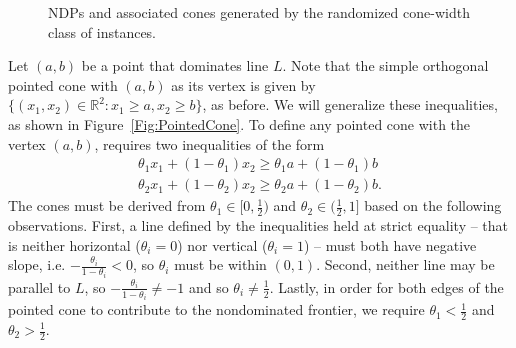\documentclass[11pt]{article} %
\def\real{\mathbb{R}}
\def\R{\real}
\begin{document}
\begin{figure}[t!]
\scriptsize
\begin{center}
\vspace{0.2cm}
\caption{NDPs and associated cones generated by the randomized cone-width class of instances. \label{Fig:RandDistInstances} }
\end{center}
\end{figure}

Let $(a,b)$ be a point that dominates line $L$. Note that the simple orthogonal pointed cone with $(a,b)$ as its vertex is given by $\{(x_1,x_2)\in\R^2: x_1 \geq a, x_2 \geq b\}$, as before. We will generalize these inequalities, as shown in Figure~\ref{Fig:PointedCone}. To define any pointed cone with the vertex $(a,b)$, requires two inequalities of the form 
\begin{align}
\theta_1 x_1 + (1-\theta_1)x_2 \geq \theta_1 a + (1-\theta_1)b \label{Eq:Cone1} \\
\theta_2 x_1 + (1-\theta_2)x_2 \geq \theta_2 a + (1-\theta_2)b. \label{Eq:Cone2}
\end{align}
The cones must be derived from $\theta_1 \in [0,\frac{1}{2})$ and $\theta_2 \in (\frac{1}{2},1]$ based on the following observations. First, a line defined by the inequalities held at strict equality -- that is neither horizontal ($\theta_i = 0$) nor vertical ($\theta_i=1$) -- must both have negative slope, i.e. $-\frac{\theta_i}{1-\theta_i}<0$, so $\theta_i$ must be within $(0,1)$. Second, neither line may be parallel to $L$, so $-\frac{\theta_i}{1-\theta_i}\neq -1$ and so $\theta_i \neq \frac{1}{2}$. Lastly, in order for both edges of the pointed cone to contribute to the nondominated frontier, we require $\theta_1 <\frac{1}{2}$ and $\theta_2 >\frac{1}{2}$. 
\end{document}
